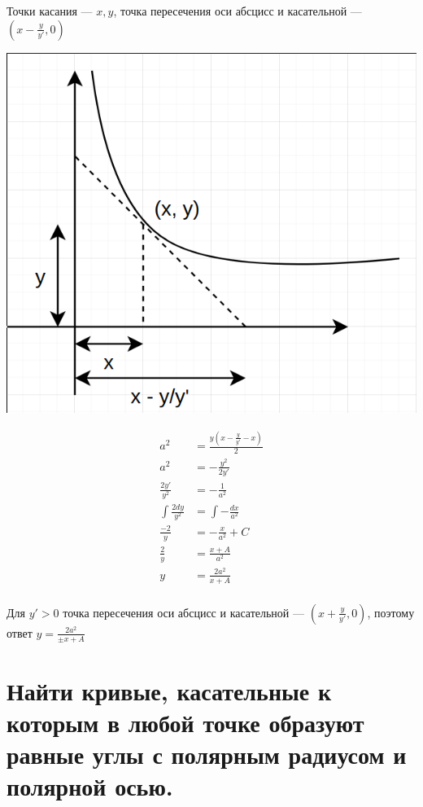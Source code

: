 Точки касания --- $x, y$, точка пересечения оси абсцисс и касательной --- $(x - \frac{y}{y'}, 0)$

\includegraphics[scale=0.4]{images/1.6.png}

\begin{align*}
    a^2                  & = \frac{y \left(x - \frac{y}{y'} - x\right)}{2} \\
    a^2                  & = -\frac{y^2}{2y'}                              \\
    \frac{2y'}{y^2}      & = -\frac{1}{a^2}                                \\
    \int \frac{2dy}{y^2} & = \int -\frac{dx}{a^2}                          \\
    \frac{-2}{y}         & = -\frac{x}{a^2} + C                            \\
    \frac{2}{y}          & = \frac{x + A}{a^2}                             \\
    y                    & =    \frac{2a^2}{x + A}                         \\
\end{align*}

Для $y'>0$ точка пересечения оси абсцисс и касательной --- $(x + \frac{y}{y'}, 0)$, поэтому ответ $y=\frac{2a^2}{\pm x + A}$

\section{Найти кривые, касательные к которым в любой точке образуют равные углы с полярным радиусом и полярной осью.}


